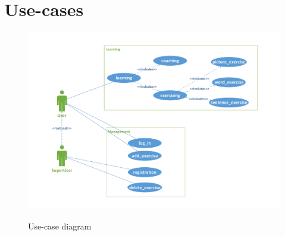 \documentclass[a4paper]{article}
\begin{document}
	\section{Use-cases}
	\begin{figure}[htbp]
		\center
		\resizebox{160mm}{!} {
			\includegraphics{figures/use-case.pdf}
		}
		\caption{Use-case diagram}
		\label{fig:use-case}
	\end{figure}

	
\end{document}
